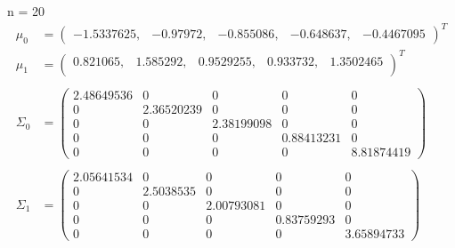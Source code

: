 \documentclass[12pt]{article}
\begin{document}
\begin{enumerate}[leftmargin=*]
    n = 20
    \begin{align*}
        \mu_0 &= \begin{pmatrix}
            -1.5337625, & -0.97972, & -0.855086, & -0.648637, & -0.4467095
        \end{pmatrix}^T \\
        \mu_1 &= \begin{pmatrix}
            0.821065, & 1.585292, & 0.9529255, & 0.933732, & 1.3502465 \\
        \end{pmatrix}^T \\ \\
        \Sigma_0 &= \begin{pmatrix}
            2.48649536 & 0 & 0 & 0 & 0 \\
            0 & 2.36520239 & 0 & 0 & 0 \\
            0 & 0 & 2.38199098 & 0 & 0 \\
            0 & 0 & 0 & 0.88413231 & 0 \\
            0 & 0 & 0 & 0 & 8.81874419 
        \end{pmatrix} \\ \\
        \Sigma_1 &= \begin{pmatrix}
            2.05641534 & 0 & 0 & 0 & 0 \\
            0 & 2.5038535 & 0 & 0 & 0 \\
            0 & 0 & 2.00793081 & 0 & 0 \\
            0 & 0 & 0 & 0.83759293 & 0 \\
            0 & 0 & 0 & 0 & 3.65894733
        \end{pmatrix}
    \end{align*}


\end{enumerate}
\end{document}
